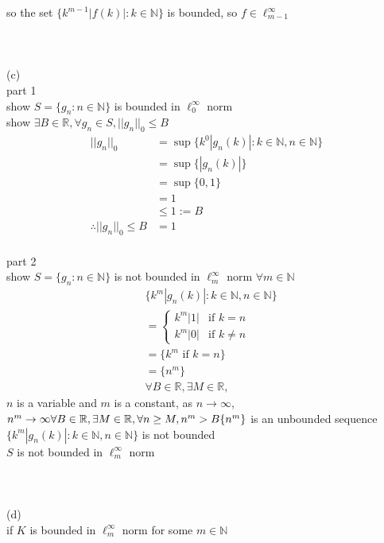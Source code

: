\documentclass[12pt, border = 4pt, multi]{article} %
\begin{document}
so the set $\{k ^ {m - 1}|f(k)|: k \in \mathbb{N}\}$ is bounded, so $f \in \ell_{m - 1} ^ {\infty}$\\
\\
\\
\\
(c)\\
part 1\\
show $S =  \{g_n: n \in \mathbb{N}\}$ is bounded in $\ell_0 ^ {\infty}$ norm\\
show $\exists B \in \mathbb{R}, \forall g_n \in S, ||g_n||_0 \leq B$
\begin{align*}
||g_n||_0 &= \sup\{k ^ 0 |g_n(k)|: k \in \mathbb{N}, n \in \mathbb{N}\}\\
&= \sup\{|g_n(k)|\}\\
&= \sup\{0, 1\}\\
&= 1\\
&\leq 1 := B\\
\therefore ||g_n||_0 \leq B &= 1
\end{align*}
\\
part 2\\
show $S =  \{g_n: n \in \mathbb{N}\}$ is not bounded in $\ell_m ^ {\infty}$ norm $\forall m \in \mathbb{N}$
\begin{align*}
&\{k ^ m |g_n(k)|: k \in \mathbb{N}, n \in \mathbb{N}\}\\
&= \begin{cases}
k ^ m|1| & \text{if } k = n\\
k ^ m|0| & \text{if } k \not= n
\end{cases}\\
&= \{k ^ m \text{ if } k = n\}\\
&= \{n ^ m\}\\
&\forall B \in \mathbb{R}, \exists M \in \mathbb{R}, 
\end{align*}
$n$ is a variable and $m$ is a constant, as $n \rightarrow \infty$, $n ^ m \rightarrow \infty\\
\forall B \in \mathbb{R}, \exists M \in \mathbb{R}, \forall n \geq M, n ^ m > B\\
\{n ^ m\}$ is an unbounded sequence\\
$\{k ^ m |g_n(k)|: k \in \mathbb{N}, n \in \mathbb{N}\}$ is not bounded\\
$S$ is not bounded in $\ell_m ^ {\infty}$ norm\\
\\
\\
\\
(d)\\
if $K$ is bounded in $\ell_m ^ {\infty}$ norm for some $m \in \mathbb{N}$
\end{document}
